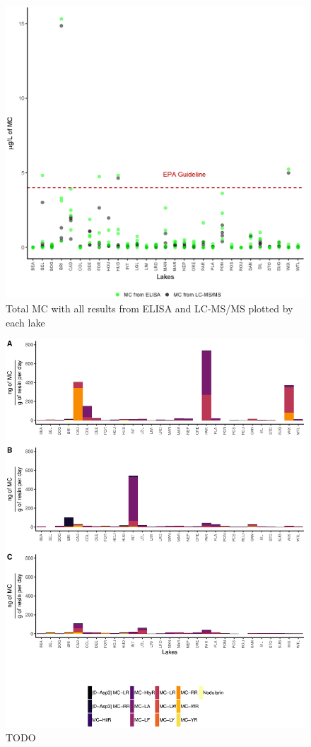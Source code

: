 \begin{figure}[!h]
	\includegraphics[width=\textwidth]{figures/Microcystin}
	\caption{Total MC with all results from ELISA and LC-MS/MS plotted by each lake}
	\label{fig:microcystin}
\end{figure}


\begin{figure}[!h] 
	\includegraphics[width=\textwidth]{figures/spatter}
	\caption{TODO}
	\label{fig:spatter}
\end{figure}


